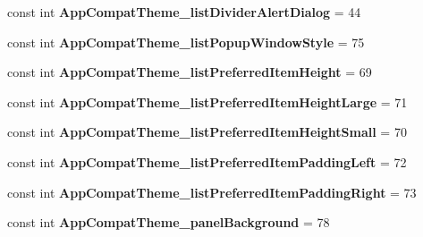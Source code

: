 \begin{DoxyCompactItemize}
\mbox{\label{class_sample_app_1_1_droid_1_1_resource_1_1_styleable_aece94b7987066e294852dc3e03ab81b9}} 
const int {\bfseries App\+Compat\+Theme\+\_\+list\+Divider\+Alert\+Dialog} = 44
\item 
\mbox{\label{class_sample_app_1_1_droid_1_1_resource_1_1_styleable_a61edd93ccb276b140966b13c9c3a0f2c}} 
const int {\bfseries App\+Compat\+Theme\+\_\+list\+Popup\+Window\+Style} = 75
\item 
\mbox{\label{class_sample_app_1_1_droid_1_1_resource_1_1_styleable_ab00170064bbee6af2ca34917a69b8af8}} 
const int {\bfseries App\+Compat\+Theme\+\_\+list\+Preferred\+Item\+Height} = 69
\item 
\mbox{\label{class_sample_app_1_1_droid_1_1_resource_1_1_styleable_a1bad1ceeea7fd9494b675a86d1b5b1bc}} 
const int {\bfseries App\+Compat\+Theme\+\_\+list\+Preferred\+Item\+Height\+Large} = 71
\item 
\mbox{\label{class_sample_app_1_1_droid_1_1_resource_1_1_styleable_a19ee05354f4498a2c84cc7a8bfc97957}} 
const int {\bfseries App\+Compat\+Theme\+\_\+list\+Preferred\+Item\+Height\+Small} = 70
\item 
\mbox{\label{class_sample_app_1_1_droid_1_1_resource_1_1_styleable_a4912dfa5bfdec27a52361b88b57b508f}} 
const int {\bfseries App\+Compat\+Theme\+\_\+list\+Preferred\+Item\+Padding\+Left} = 72
\item 
\mbox{\label{class_sample_app_1_1_droid_1_1_resource_1_1_styleable_a30cdb306d6a2f3b3dd6a697f2b264f67}} 
const int {\bfseries App\+Compat\+Theme\+\_\+list\+Preferred\+Item\+Padding\+Right} = 73
\item 
\mbox{\label{class_sample_app_1_1_droid_1_1_resource_1_1_styleable_a08c1531f0b60253441518cb5d51ed2bc}} 
const int {\bfseries App\+Compat\+Theme\+\_\+panel\+Background} = 78

\end{DoxyCompactItemize}
